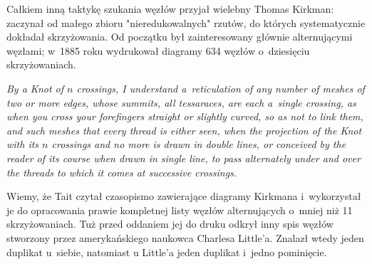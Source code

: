 Całkiem inną taktykę szukania węzłów przyjał wielebny Thomas Kirkman: zaczynał od małego zbioru "nieredukowalnych" rzutów, do których systematycznie dokładał skrzyżowania.
%
Od początku był zainteresowany głównie alternującymi węzłami; w~1885 roku wydrukował diagramy 634 węzłów o~dziesięciu skrzyżowaniach.

\begin{definition}
    \emph{By a Knot of $n$ crossings, I understand a~reticulation of any number of meshes of two or more edges, whose summits, all tessaraces, are each a~single crossing, as when you cross your forefingers straight or slightly curved, so as not to link them, and such meshes that every thread is either seen, when the projection of the Knot with its $n$ crossings and no more is drawn in double lines, or conceived by the reader of its course when drawn in single line, to pass alternately under and over the threads to which it comes at successive crossings.}
\end{definition}

Wiemy, że Tait czytał czasopismo zawierające diagramy Kirkmana i~wykorzystał je do opracowania prawie kompletnej listy węzłów alternujących o~mniej niż 11 skrzyżowaniach.
Tuż przed oddaniem jej do druku odkrył inny spis węzłów stworzony przez amerykańskiego naukowca Charlesa Little'a.
%
Znalazł wtedy jeden duplikat u~siebie, natomiast u Little'a jeden duplikat i~jedno pominięcie.

